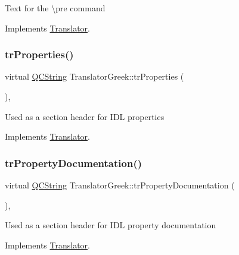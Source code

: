 Text for the \textbackslash{}pre command 

Implements \mbox{\hyperlink{class_translator}{Translator}}.

\mbox{\label{class_translator_greek_afd66c8609a06dae918eca632386bc0c5}} 
\subsubsection{\texorpdfstring{trProperties()}{trProperties()}}
{\footnotesize\ttfamily virtual \mbox{\hyperlink{class_q_c_string}{Q\+C\+String}} Translator\+Greek\+::tr\+Properties (\begin{DoxyParamCaption}{ }\end{DoxyParamCaption})\hspace{0.3cm}{\ttfamily [inline]}, {\ttfamily [virtual]}}

Used as a section header for I\+DL properties 

Implements \mbox{\hyperlink{class_translator}{Translator}}.

\mbox{\label{class_translator_greek_ad05f93bad4987001974fedddc09be219}} 
\subsubsection{\texorpdfstring{trPropertyDocumentation()}{trPropertyDocumentation()}}
{\footnotesize\ttfamily virtual \mbox{\hyperlink{class_q_c_string}{Q\+C\+String}} Translator\+Greek\+::tr\+Property\+Documentation (\begin{DoxyParamCaption}{ }\end{DoxyParamCaption})\hspace{0.3cm}{\ttfamily [inline]}, {\ttfamily [virtual]}}

Used as a section header for I\+DL property documentation 

Implements \mbox{\hyperlink{class_translator}{Translator}}.

\mbox{\label{class_translator_greek_ac39f8dfb0baf27a7f26d9e3652ee9528}} 
